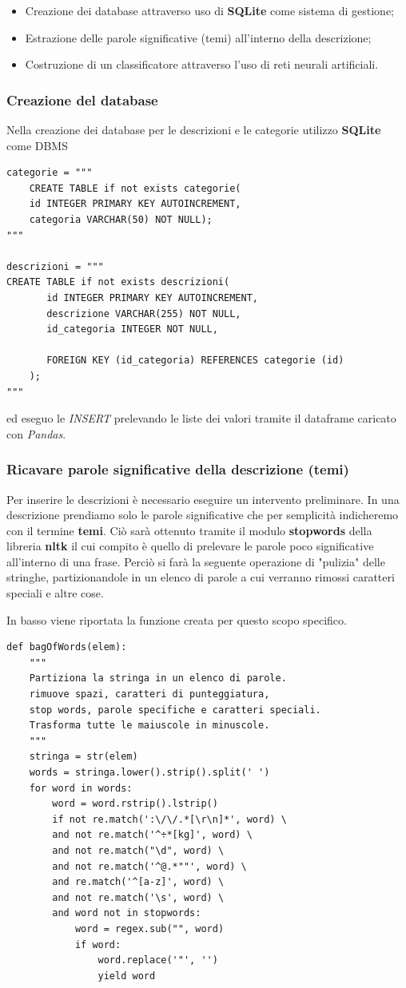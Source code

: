 \documentclass[10pt,a4paper]{report}
\begin{document}
\begin{itemize}
\item Creazione dei database attraverso uso di \textbf{SQLite} come sistema di gestione;
\item Estrazione delle parole significative (temi) all'interno della descrizione;
\item Costruzione di un classificatore attraverso l'uso di reti neurali artificiali.
\end{itemize}

\subsubsection*{Creazione del database}
Nella creazione dei database per le descrizioni e le categorie utilizzo \textbf{SQLite} come DBMS
\begin{verbatim}
categorie = """
    CREATE TABLE if not exists categorie(
    id INTEGER PRIMARY KEY AUTOINCREMENT, 
    categoria VARCHAR(50) NOT NULL);
"""

descrizioni = """
CREATE TABLE if not exists descrizioni(
       id INTEGER PRIMARY KEY AUTOINCREMENT,
       descrizione VARCHAR(255) NOT NULL,
       id_categoria INTEGER NOT NULL,
       
       FOREIGN KEY (id_categoria) REFERENCES categorie (id)
    );
"""
\end{verbatim}
ed eseguo le \textit{INSERT} prelevando le liste dei valori tramite il dataframe caricato con \textit{Pandas}. 

\subsubsection*{Ricavare parole significative della descrizione (temi)}
Per inserire le descrizioni è necessario eseguire un intervento preliminare.
In una descrizione prendiamo solo le parole significative che per semplicità indicheremo con il termine \textbf{temi}. Ciò sarà ottenuto tramite il modulo \textbf{stopwords} della libreria \textbf{nltk} il cui compito è quello di prelevare le parole poco significative all'interno di una frase.
Perciò si farà la seguente operazione di "pulizia" delle stringhe, partizionandole in un elenco di parole a cui verranno rimossi caratteri speciali e altre cose. 

In basso viene riportata la funzione creata per questo scopo specifico.
\begin{verbatim}
def bagOfWords(elem):
    """
    Partiziona la stringa in un elenco di parole.
    rimuove spazi, caratteri di punteggiatura,
    stop words, parole specifiche e caratteri speciali.
    Trasforma tutte le maiuscole in minuscole.
    """
    stringa = str(elem)
    words = stringa.lower().strip().split(' ')
    for word in words:
        word = word.rstrip().lstrip()
        if not re.match(':\/\/.*[\r\n]*', word) \
        and not re.match('^÷*[kg]', word) \
        and not re.match("\d", word) \
        and not re.match('^@.*""', word) \
        and re.match('^[a-z]', word) \
        and not re.match('\s', word) \
        and word not in stopwords:
            word = regex.sub("", word)
            if word:
                word.replace('"', '')
                yield word
\end{verbatim}
\end{document}
